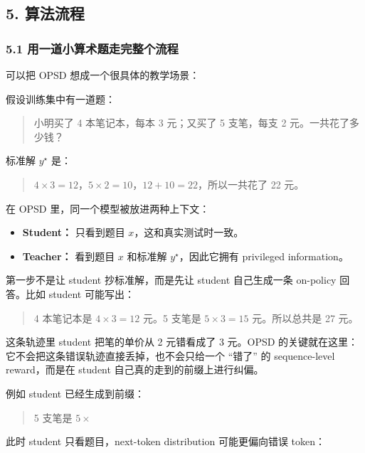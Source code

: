 \subsection{5. 算法流程}

\subsubsection{5.1 用一道小算术题走完整个流程}

可以把 OPSD 想成一个很具体的教学场景：

假设训练集中有一道题：

\begin{quote}
小明买了 4 本笔记本，每本 3 元；又买了 5 支笔，每支 2 元。一共花了多少钱？
\end{quote}

标准解 $y^\star$ 是：

\begin{quote}
$4\times 3=12$，$5\times 2=10$，$12+10=22$，所以一共花了 22 元。
\end{quote}

在 OPSD 里，同一个模型被放进两种上下文：

\begin{itemize}[leftmargin=1.5em]
  \item \textbf{Student：} 只看到题目 $x$，这和真实测试时一致。
  \item \textbf{Teacher：} 看到题目 $x$ 和标准解 $y^\star$，因此它拥有 privileged information。
\end{itemize}

第一步不是让 student 抄标准解，而是先让 student 自己生成一条 on-policy 回答。比如 student 可能写出：

\begin{quote}
4 本笔记本是 $4\times 3=12$ 元。5 支笔是 $5\times 3=15$ 元。所以总共是 27 元。
\end{quote}

这条轨迹里 student 把笔的单价从 2 元错看成了 3 元。OPSD 的关键就在这里：它不会把这条错误轨迹直接丢掉，也不会只给一个 ``错了'' 的 sequence-level reward，而是在 student 自己真的走到的前缀上进行纠偏。

例如 student 已经生成到前缀：

\begin{quote}
5 支笔是 $5\times$
\end{quote}

此时 student 只看题目，next-token distribution 可能更偏向错误 token：

